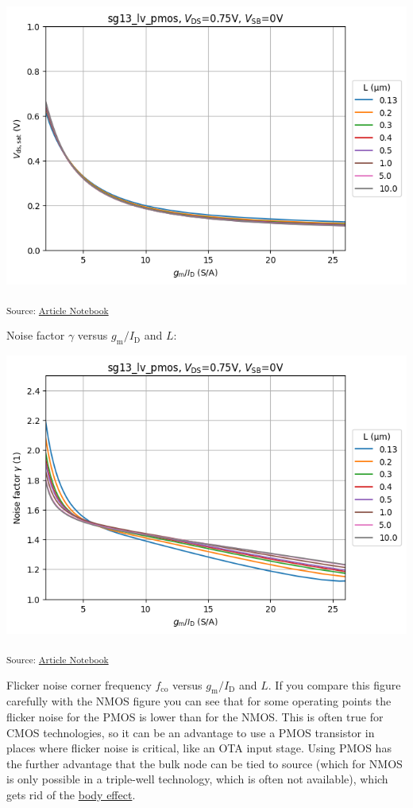 \documentclass[
  a4paper,
  DIV=11,
  numbers=noendperiod]{scrartcl}
\begin{document}
\includegraphics{index_files/figure-latex/.-sizing-techsweep_sg13_plots_pmos-cell-12-output-1.png}

\textsubscript{Source:
\href{https://iic-jku.github.io/analog-circuit-design/index.qmd.html}{Article
Notebook}}

Noise factor \(\gamma\) versus \(g_\mathrm{m}/I_\mathrm{D}\) and \(L\):

\includegraphics{index_files/figure-latex/.-sizing-techsweep_sg13_plots_pmos-cell-13-output-1.png}

\textsubscript{Source:
\href{https://iic-jku.github.io/analog-circuit-design/index.qmd.html}{Article
Notebook}}

Flicker noise corner frequency \(f_\mathrm{co}\) versus
\(g_\mathrm{m}/I_\mathrm{D}\) and \(L\). If you compare this figure
carefully with the NMOS figure you can see that for some operating
points the flicker noise for the PMOS is lower than for the NMOS. This
is often true for CMOS technologies, so it can be an advantage to use a
PMOS transistor in places where flicker noise is critical, like an OTA
input stage. Using PMOS has the further advantage that the bulk node can
be tied to source (which for NMOS is only possible in a triple-well
technology, which is often not available), which gets rid of the
\href{https://en.wikipedia.org/wiki/Threshold_voltage}{body effect}.
\end{document}
